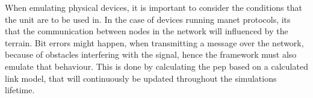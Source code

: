 When emulating physical devices, it is important to consider the conditions that the unit are to be used in. In the case of devices running \gls{manet} protocols, its that the communication between nodes in the network will influenced by the terrain. Bit errors might happen, when transmitting a message over the network, because of obstacles interfering with the signal, hence the framework must also emulate that behaviour. This is done by calculating the \gls{pep} based on a calculated link model, that will continuously be updated throughout the simulations lifetime.





%
%
%
%
%